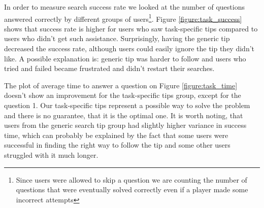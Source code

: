 \documentclass{sig-alternate}
\begin{document}

In order to measure search success rate we looked at the number of questions answered correctly by different groups of users\footnote{Since users were allowed to skip a question we are counting the number of questions that were eventually solved correctly even if a player made some incorrect attempts}. Figure \ref{figure:task_success} shows that success rate is higher for users who saw task-specific tips compared to users who didn't get such assistance.
Surprisingly, having the generic tip decreased the success rate, although users could easily ignore the tip they didn't like.
A possible explanation is: generic tip was harder to follow and users who tried and failed became frustrated and didn't restart their searches.

The plot of average time to answer a question on Figure \ref{figure:task_time} doesn't show an improvement for the task-specific tips group, except for the question 1.
Our task-specific tips represent a possible way to solve the problem and there is no guarantee, that it is the optimal one.
It is worth noting, that users from the generic search tip group had slightly higher variance in success time, which can probably be explained by the fact that some users were successful in finding the right way to follow the tip and some other users struggled with it much longer.
\end{document}
